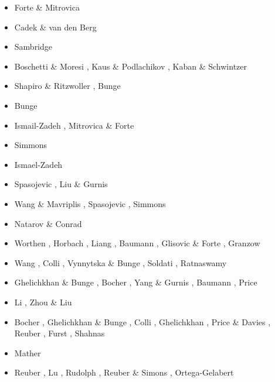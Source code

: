 \begin{scriptsize}
\begin{itemize}
\item[\nineteenninetysix] Forte \& Mitrovica \cite{fomi96} 
\item[\nineteenninetyeight] Cadek \& van den Berg \cite{cava98}
\item[\nineteenninetynine] Sambridge \cite{samb99,samb99b}
\item[\twothousandone] Boschetti \& Moresi \cite{bomo01}, Kaus \& Podlachikov \cite{kapo01}, 
                       Kaban \& Schwintzer \cite{kasc01}
\item[\twothousandtwo] Shapiro \& Ritzwoller \cite{shri02}, Bunge \etal \cite{burb02}
\item[\twothousandthree] Bunge \etal \cite{buht03}
\item[\twothousandfour] Ismail-Zadeh \etal \cite{isst04}, Mitrovica \& Forte \cite{mifo04}
\item[\twothousandsixteen] Simmons \etal \cite{sifg06}
\item[\twothousandseven] Ismael-Zadeh \etal \cite{isks07}
\item[\twothousandeight] Spasojevic \etal \cite{splg08}, Liu \& Gurnis \cite{ligu08}
\item[\twothousandnine] Wang \& Mavriplis \cite{wama09}, Spasojevic \etal \cite{splg09},
                        Simmons \etal \cite{sifg09}
\item[\twothousandtwelve] Natarov \& Conrad \cite{naco12}
\item[\twothousandfourteen] Worthen \etal \cite{wosp14}, Horbach \etal \cite{hobo14},
                            Liang \etal \cite{licl14}, Baumann \etal \cite{bakp14},
                            Glisovic \& Forte \cite{glfo14}, Granzow \cite{gran14}
\item[\twothousandfifteen] Wang \etal \cite{wahg15}, Colli \etal \cite{cobs15},
                           Vynnytska \& Bunge \cite{vybu15}, Soldati \etal \cite{sobd15},
                           Ratnaswamy \etal \cite{rasg15}
\item[\twothousandsixteen] Ghelichkhan \& Bunge \cite{ghbu16}, Bocher \etal \cite{bocf16},
                           Yang \& Gurnis \cite{yagu16}, Baumann \cite{baum16},
                           Price \cite{pric16}
\item[\twothousandseventeen] Li \etal \cite{ligs17}, Zhou \& Liu \cite{zhli17}
\item[\twothousandeighteen] Bocher \etal \cite{bofc18}, Ghelichkhan \& Bunge \cite{ghbu18}, 
                            Colli \etal \cite{cogb18}, Ghelichkhan \etal \cite{ghmc18},
                            Price \& Davies \cite{prda18}, Reuber \etal \cite{repk18},
                            Furst \etal \cite{fupc18}, Shahnas \etal \cite{shyp18}
\item[\twothousandnineteen] Mather \etal \cite{mamr19} 
\item[\twothousandtwenty] Reuber \etal \cite{rehp20}, Lu \etal{} \cite{lufs20},
                          Rudolph \etal \cite{ruml20}, Reuber \& Simons \cite{resi20},
                          Ortega-Gelabert \etal \cite{orza20}
\end{itemize}
\end{scriptsize}

